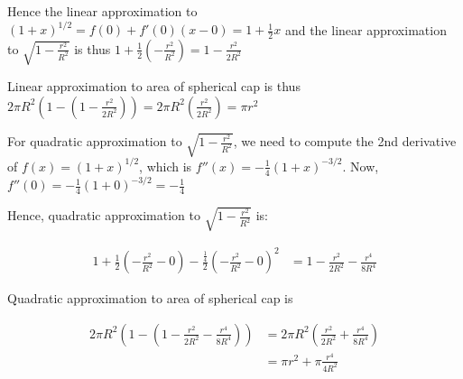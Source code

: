 \documentclass[9pt]{article}
\begin{document}
Hence the linear approximation to $(1 + x)^{1/2} = f(0) + f'(0)(x - 0) = 1 + \frac{1}{2}x$ and the linear approximation to $\sqrt{1 - \frac{r^2}{R^2}}$ is thus $1 + \frac{1}{2}(-\frac{r^2}{R^2}) = 1 - \frac{r^2}{2R^2}$

Linear approximation to area of spherical cap is thus $2 \pi R^2 (1 - (1 - \frac{r^2}{2R^2})) = 2 \pi R^2 (\frac{r^2}{2R^2}) = \pi r^2$

For quadratic approximation to $\sqrt{1 - \frac{r^2}{R^2}}$, we need to compute the 2nd derivative of $f(x) = (1 + x)^{1/2}$, which is $f''(x) = -\frac{1}{4}(1 + x)^{-3/2}$. Now, $f''(0) = -\frac{1}{4}(1 + 0)^{-3/2} = -\frac{1}{4}$

Hence, quadratic approximation to $\sqrt{1 - \frac{r^2}{R^2}}$ is:

\begin{align*}
  1 + \frac{1}{2}(-\frac{r^2}{R^2} - 0) - \frac{\frac{1}{4}}{2}(-\frac{r^2}{R^2} - 0)^2 &= 1 - \frac{r^2}{2R^2} - \frac{r^4}{8R^4}
\end{align*}

Quadratic approximation to area of spherical cap is

\begin{align*}
  2 \pi R^2 (1 - (1 - \frac{r^2}{2R^2} - \frac{r^4}{8R^4})) &= 2 \pi R^2 (\frac{r^2}{2R^2} + \frac{r^4}{8R^4}) \\
                                                            &= \pi r^2 + \pi \frac{r^4}{4R^2}
\end{align*}
\end{document}
